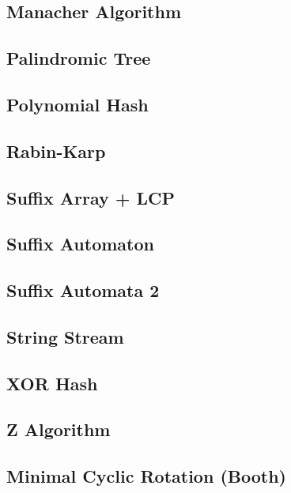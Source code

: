 \documentclass[10pt,letterpaper,landscape,twocolumn]{article}
\begin{document}
\subsection{Manacher Algorithm}

\subsection{Palindromic Tree}

\subsection{Polynomial Hash}

\subsection{Rabin-Karp}

\subsection{Suffix Array + LCP}

\subsection{Suffix Automaton}

\subsection{Suffix Automata 2}

\subsection{String Stream}

\subsection{XOR Hash}

\subsection{Z Algorithm}

\subsection{Minimal Cyclic Rotation (Booth)}

\end{document}

